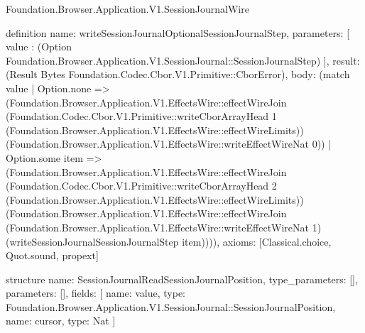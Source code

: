 \begin{lexlean}{Foundation.Browser.Application.V1.SessionJournalWire}
\begin{semanticmodule}
definition{
  name: writeSessionJournalOptionalSessionJournalStep,
  parameters: [
    value : (Option Foundation.Browser.Application.V1.SessionJournal::SessionJournalStep)
  ],
  result: (Result Bytes Foundation.Codec.Cbor.V1.Primitive::CborError),
  body: (match value
    | Option.none => (Foundation.Browser.Application.V1.EffectsWire::effectWireJoin (Foundation.Codec.Cbor.V1.Primitive::writeCborArrayHead 1 (Foundation.Browser.Application.V1.EffectsWire::effectWireLimits)) (Foundation.Browser.Application.V1.EffectsWire::writeEffectWireNat 0))
    | Option.some item => (Foundation.Browser.Application.V1.EffectsWire::effectWireJoin (Foundation.Codec.Cbor.V1.Primitive::writeCborArrayHead 2 (Foundation.Browser.Application.V1.EffectsWire::effectWireLimits)) (Foundation.Browser.Application.V1.EffectsWire::effectWireJoin (Foundation.Browser.Application.V1.EffectsWire::writeEffectWireNat 1) (writeSessionJournalSessionJournalStep item)))),
  axioms: [Classical.choice, Quot.sound, propext]
}

structure{
  name: SessionJournalReadSessionJournalPosition,
  type_parameters: [],
  parameters: [],
  fields: [
    {name: value, type: Foundation.Browser.Application.V1.SessionJournal::SessionJournalPosition},
    {name: cursor, type: Nat}
  ]
}


\end{semanticmodule}
\end{lexlean}
